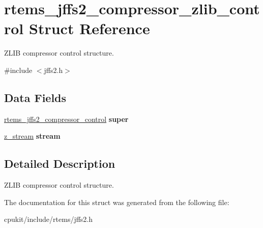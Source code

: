 \hypertarget{structrtems__jffs2__compressor__zlib__control}{}\section{rtems\+\_\+jffs2\+\_\+compressor\+\_\+zlib\+\_\+control Struct Reference}
\label{structrtems__jffs2__compressor__zlib__control}


Z\+L\+IB compressor control structure.  




{\ttfamily \#include $<$jffs2.\+h$>$}

\subsection*{Data Fields}
\begin{DoxyCompactItemize}
\item 
\mbox{\label{structrtems__jffs2__compressor__zlib__control_a59934f2130b1752dc651ad55a7e6da8a}} 
\mbox{\hyperlink{structrtems__jffs2__compressor__control}{rtems\+\_\+jffs2\+\_\+compressor\+\_\+control}} {\bfseries super}
\item 
\mbox{\label{structrtems__jffs2__compressor__zlib__control_a473228cfbe365a233b2374c532e483c9}} 
\mbox{\hyperlink{structz__stream__s}{z\+\_\+stream}} {\bfseries stream}
\end{DoxyCompactItemize}


\subsection{Detailed Description}
Z\+L\+IB compressor control structure. 

The documentation for this struct was generated from the following file\+:\begin{DoxyCompactItemize}
\item 
cpukit/include/rtems/jffs2.\+h\end{DoxyCompactItemize}
